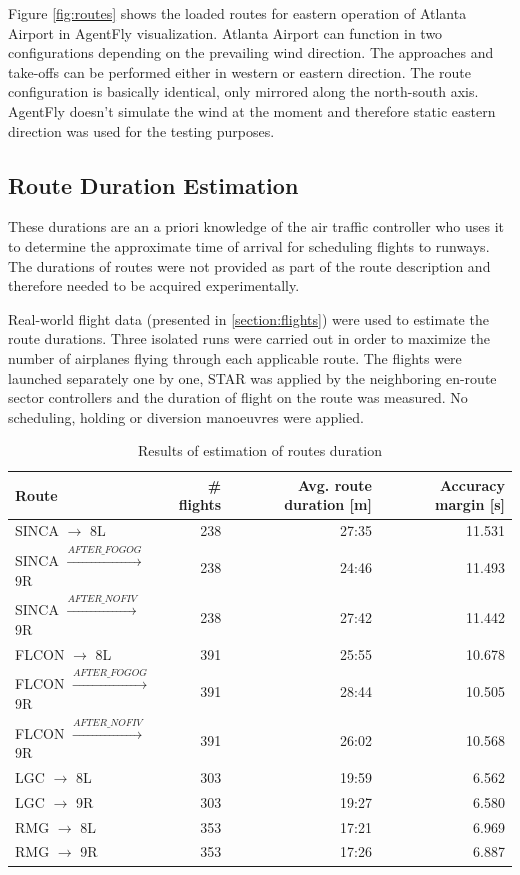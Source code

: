 Figure \ref{fig:routes} shows the loaded routes for eastern operation of Atlanta Airport in AgentFly visualization. Atlanta Airport can function in two configurations depending on the prevailing wind direction. The approaches and take-offs can be performed either in western or eastern direction. The route configuration is basically identical, only mirrored along the north-south axis. AgentFly doesn't simulate the wind at the moment and therefore static eastern direction was used for the testing purposes.


\subsection{Route Duration Estimation}

 These durations are an a priori knowledge of the air traffic controller who uses it to determine the approximate time of arrival for scheduling flights to runways. The durations of routes were not provided as part of the route description and therefore needed to be acquired experimentally.

Real-world flight data (presented in \ref{section:flights}) were used to estimate the route durations. Three isolated runs were carried out in order to maximize the number of airplanes flying through each applicable route. The flights were launched separately one by one, STAR was applied by the neighboring en-route sector controllers and the duration of flight on the route was measured. No scheduling, holding or diversion manoeuvres were applied.

\begin{table}[h]
  \centering
\begin{tabular}{ | l | r | r | r | }
\hline
Route   & \# flights & Avg. route duration [m]  & Accuracy margin [s] \\
\hline
SINCA $\rightarrow$ 8L                & 238 & 27:35 & 11.531  \\
SINCA $\xrightarrow{AFTER\_FOGOG}$ 9R & 238 & 24:46 & 11.493  \\
SINCA $\xrightarrow{AFTER\_NOFIV}$ 9R & 238 & 27:42 & 11.442  \\

FLCON $\rightarrow$ 8L                & 391 & 25:55 & 10.678  \\
FLCON $\xrightarrow{AFTER\_FOGOG}$ 9R & 391 & 28:44 & 10.505  \\
FLCON $\xrightarrow{AFTER\_NOFIV}$ 9R & 391 & 26:02 & 10.568  \\

LGC $\rightarrow$ 8L   & 303 & 19:59 & 6.562  \\
LGC $\rightarrow$ 9R   & 303 & 19:27 & 6.580  \\

RMG $\rightarrow$ 8L   & 353 & 17:21 & 6.969  \\
RMG $\rightarrow$ 9R   & 353 & 17:26 & 6.887  \\
\hline
\end{tabular}
  \caption{Results of estimation of routes duration}
  \label{tab:route_duration}
\end{table}

